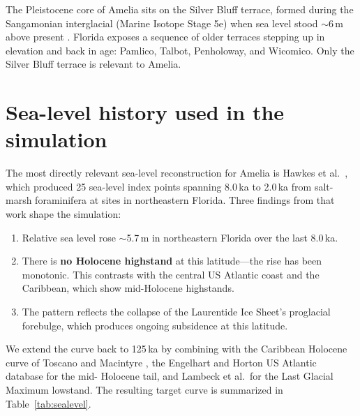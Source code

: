\documentclass[11pt]{article}
\begin{document}
The Pleistocene core of Amelia sits on the Silver Bluff terrace, formed during the
Sangamonian interglacial (Marine Isotope Stage 5e) when sea level stood
$\sim$6\,m above present \cite{georgyofflorida}. Florida exposes a sequence of older
terraces stepping up in elevation and back in age: Pamlico, Talbot, Penholoway, and
Wicomico. Only the Silver Bluff terrace is relevant to Amelia.

\section{Sea-level history used in the simulation}

The most directly relevant sea-level reconstruction for Amelia is Hawkes et al.\
\cite{hawkes2016}, which produced 25 sea-level index points spanning 8.0\,ka to
2.0\,ka from salt-marsh foraminifera at sites in northeastern Florida. Three
findings from that work shape the simulation:

\begin{enumerate}[leftmargin=2em]
\item Relative sea level rose $\sim$5.7\,m in northeastern Florida over the last
8.0\,ka.
\item There is \textbf{no Holocene highstand} at this latitude---the rise has been
monotonic. This contrasts with the central US Atlantic coast and the Caribbean,
which show mid-Holocene highstands.
\item The pattern reflects the collapse of the Laurentide Ice Sheet's proglacial
forebulge, which produces ongoing subsidence at this latitude.
\end{enumerate}

We extend the curve back to 125\,ka by combining \cite{hawkes2016} with the
Caribbean Holocene curve of Toscano and Macintyre \cite{toscano2003}, the
Engelhart and Horton US Atlantic database \cite{engelhart2012} for the mid-
Holocene tail, and Lambeck et al.\ for the Last Glacial Maximum lowstand. The
resulting target curve is summarized in Table~\ref{tab:sealevel}.
\end{document}
